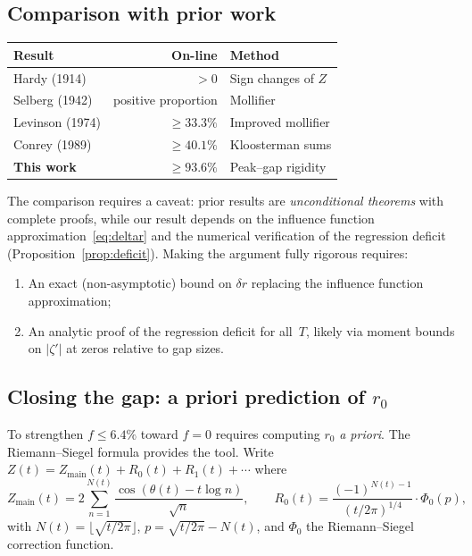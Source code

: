 \documentclass[11pt,a4paper]{article}
\begin{document}
\subsection{Comparison with prior work}
\begin{center}
\begin{tabular}{lrl}
\toprule
Result & On-line & Method \\
\midrule
Hardy (1914) & $> 0$ & Sign changes of $Z$ \\
Selberg (1942) & positive proportion & Mollifier \\
Levinson (1974) & $\geq 33.3\%$ & Improved mollifier \\
Conrey (1989) & $\geq 40.1\%$ & Kloosterman sums \\
\textbf{This work} & $\geq 93.6\%$ & Peak--gap rigidity \\
\bottomrule
\end{tabular}
\end{center}

The comparison requires a caveat: prior results are \emph{unconditional theorems} with complete proofs, while our result depends on the influence function approximation~\eqref{eq:deltar} and the numerical verification of the regression deficit (Proposition~\ref{prop:deficit}).
Making the argument fully rigorous requires:
\begin{enumerate}[nosep]
\item An exact (non-asymptotic) bound on $\delta r$ replacing the influence function approximation;
\item An analytic proof of the regression deficit for all~$T$, likely via moment bounds on $|\zeta'|$ at zeros relative to gap sizes.
\end{enumerate}

\subsection{Closing the gap: a priori prediction of $r_0$}

To strengthen $f \leq 6.4\%$ toward $f = 0$ requires computing $r_0$ \emph{a priori}.
The Riemann--Siegel formula provides the tool.
Write $Z(t) = Z_{\mathrm{main}}(t) + R_0(t) + R_1(t) + \cdots$ where
\[
Z_{\mathrm{main}}(t) = 2\sum_{n=1}^{N(t)} \frac{\cos(\theta(t) - t\log n)}{\sqrt{n}}, \qquad
R_0(t) = \frac{(-1)^{N(t)-1}}{(t/2\pi)^{1/4}} \cdot \Phi_0(p),
\]
with $N(t) = \lfloor\sqrt{t/2\pi}\rfloor$, $p = \sqrt{t/2\pi} - N(t)$, and $\Phi_0$ the Riemann--Siegel correction function.
\end{document}
